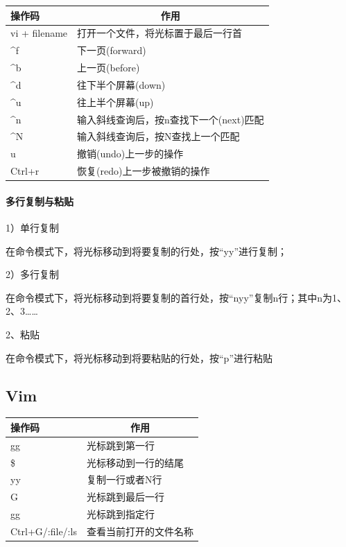 \documentclass{book}
\begin{document}
\begin{tabular}{l|p{10cm}}
	\multirow{1}{*}{操作码}			
	& \multicolumn{1}{c}{作用}\\	 
	\hline
	vi + filename & 打开一个文件，将光标置于最后一行首\\
	\hline
	\textasciicircum f & 下一页(forward)\\
	\hline 
	\textasciicircum b & 上一页(before)\\
	\hline
	\textasciicircum d & 往下半个屏幕(down)\\
	\hline
	\textasciicircum u & 往上半个屏幕(up)\\
	\hline
	\textasciicircum n & 输入斜线查询后，按n查找下一个(next)匹配\\
	\hline
	\textasciicircum N & 输入斜线查询后，按N查找上一个匹配\\
	\hline
	u & 撤销(undo)上一步的操作\\
	\hline
	Ctrl+r & 恢复(redo)上一步被撤销的操作\\
	\hline
	\end{tabular}

\paragraph{多行复制与粘贴}

1）单行复制

在命令模式下，将光标移动到将要复制的行处，按“yy”进行复制；

2）多行复制

在命令模式下，将光标移动到将要复制的首行处，按“nyy”复制n行；其中n为1、2、3……

2、粘贴

在命令模式下，将光标移动到将要粘贴的行处，按“p”进行粘贴

\subsection{Vim}

\begin{tabular}{l|p{10cm}}
	\multirow{1}{*}{操作码}			
	& \multicolumn{1}{c}{作用}\\	 
	\hline
	gg & 光标跳到第一行\\
	\hline
	\$ & 光标移动到一行的结尾\\
	\hline
	[N]yy & 复制一行或者N行\\
	\hline
	G & 光标跳到最后一行\\
	\hline
	[n]gg & 光标跳到指定行\\
	\hline
	Ctrl+G/:file/:ls & 查看当前打开的文件名称\\
	\hline
\end{tabular}
\end{document}
